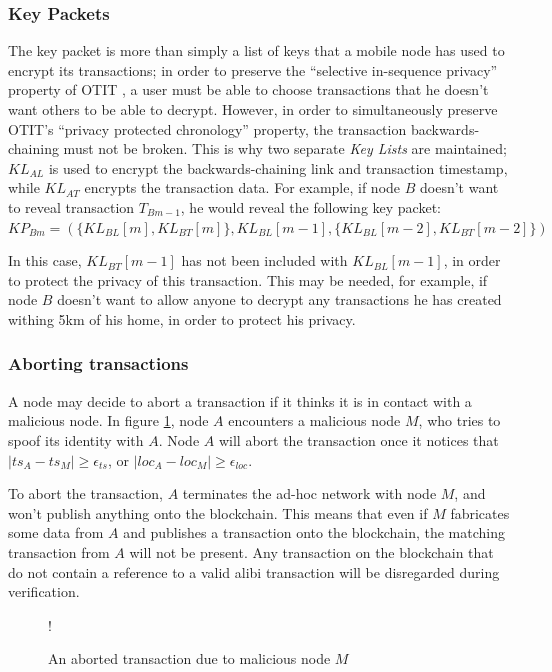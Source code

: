 \documentclass[12pt]{article}
\begin{document}
\subsubsection{Key Packets} \label{sssec:key_packets}
The key packet is more than simply a list of keys that a mobile node has used to encrypt its transactions; in order to preserve the ``selective in-sequence privacy'' property of OTIT \cite{otit}, a user must be able to choose transactions that he doesn't want others to be able to decrypt. However, in order to simultaneously preserve OTIT's ``privacy protected chronology'' property, the transaction backwards-chaining must not be broken. This is why two separate \textit{Key Lists} are maintained; $KL_{AL}$ is used to encrypt the backwards-chaining link and transaction timestamp, while $KL_{AT}$ encrypts the transaction data. For example, if node $B$ doesn't want to reveal transaction $T_{Bm-1}$, he would reveal the following key packet:
\\

${KP_{Bm} = (\{KL_{BL}[m], KL_{BT}[m]\}, KL_{BL}[m-1], \{KL_{BL}[m-2], KL_{BT}[m-2]\})}$

\null
In this case, $KL_{BT}[m-1]$ has not been included with $KL_{BL}[m-1]$, in order to protect the privacy of this transaction. This may be needed, for example, if node $B$ doesn't want to allow anyone to decrypt any transactions he has created withing 5km of his home, in order to protect his privacy.

\subsubsection{Aborting transactions}
A node may decide to abort a transaction if it thinks it is in contact with a malicious node. In figure \ref{fig:aborted_transaction}, node $A$ encounters a malicious node $M$, who tries to spoof its identity with $A$. Node $A$ will abort the transaction once it notices that $|ts_A-ts_M| \geq \epsilon_{ts}$, or $|loc_A-loc_M| \geq \epsilon_{loc}$.

To abort the transaction, $A$ terminates the ad-hoc network with node $M$, and won't publish anything onto the blockchain. This means that even if $M$ fabricates some data from $A$ and publishes a transaction onto the blockchain, the matching transaction from $A$ will not be present. Any transaction on the blockchain that do not contain a reference to a valid  alibi transaction will be disregarded during verification.

\begin{figure}[h]
\resizebox {\columnwidth} {!} {}
\caption{An aborted transaction due to malicious node $M$}
\label{fig:aborted_transaction}
\end{figure}
\end{document}
